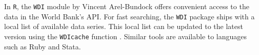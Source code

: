 In \texttt{R}, the \texttt{WDI} module by Vincent Arel-Bundock offers convenient access to the data in the World Bank's API. For fast searching, the \texttt{WDI} package ships with a local list of available data series. This local list can be updated to the latest version using the \texttt{WDIcache} function \parencite{wb_r}. Similar tools are available to languages such as Ruby and Stata.










